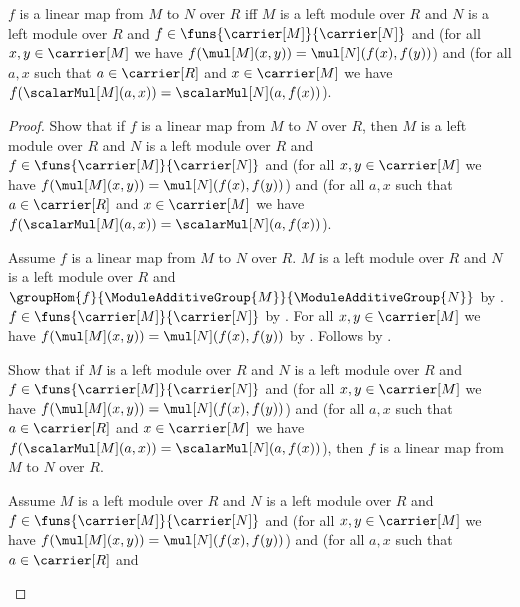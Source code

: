 \begin{theorem}\label{linear_map_expanded_iff}
    $f$ is a linear map from $M$ to $N$ over $R$ iff
        $M$ is a left module over $R$ and
        $N$ is a left module over $R$ and
        $f\in\funs{\carrier[M]}{\carrier[N]}$ and
        (for all $x,y\in\carrier[M]$ we have
            $f(\mul[M](x,y))=\mul[N](f(x),f(y))$) and
        (for all $a,x$ such that
            $a\in\carrier[R]$ and $x\in\carrier[M]$ we have
            $f(\scalarMul[M](a,x))=\scalarMul[N](a,f(x))$).
\end{theorem}
\begin{proof}
    Show that if $f$ is a linear map from $M$ to $N$ over $R$, then
        $M$ is a left module over $R$ and
        $N$ is a left module over $R$ and
        $f\in\funs{\carrier[M]}{\carrier[N]}$ and
        (for all $x,y\in\carrier[M]$ we have
            $f(\mul[M](x,y))=\mul[N](f(x),f(y))$) and
        (for all $a,x$ such that $a\in\carrier[R]$ and
            $x\in\carrier[M]$ we have
            $f(\scalarMul[M](a,x))=\scalarMul[N](a,f(x))$).
    \begin{subproof}
        Assume $f$ is a linear map from $M$ to $N$ over $R$.
        $M$ is a left module over $R$ and
            $N$ is a left module over $R$ and
            $\groupHom{f}{\ModuleAdditiveGroup{M}}{
                \ModuleAdditiveGroup{N}}$ by .
        $f\in\funs{\carrier[M]}{\carrier[N]}$ by
            .
        For all $x,y\in\carrier[M]$ we have
            $f(\mul[M](x,y))=\mul[N](f(x),f(y))$ by
            .
        Follows by .
    \end{subproof}
    Show that if
        $M$ is a left module over $R$ and
        $N$ is a left module over $R$ and
        $f\in\funs{\carrier[M]}{\carrier[N]}$ and
        (for all $x,y\in\carrier[M]$ we have
            $f(\mul[M](x,y))=\mul[N](f(x),f(y))$) and
        (for all $a,x$ such that $a\in\carrier[R]$ and
            $x\in\carrier[M]$ we have
            $f(\scalarMul[M](a,x))=\scalarMul[N](a,f(x))$),
        then $f$ is a linear map from $M$ to $N$ over $R$.
    \begin{subproof}
        Assume
            $M$ is a left module over $R$ and
            $N$ is a left module over $R$ and
            $f\in\funs{\carrier[M]}{\carrier[N]}$ and
            (for all $x,y\in\carrier[M]$ we have
                $f(\mul[M](x,y))=\mul[N](f(x),f(y))$) and
            (for all $a,x$ such that $a\in\carrier[R]$ and

\end{subproof}
\end{proof}
